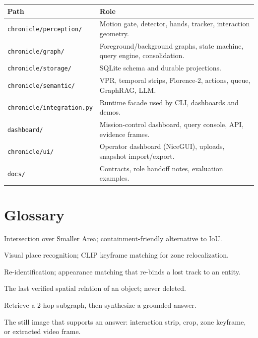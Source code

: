 \documentclass[10pt,a4paper]{article}
\newcommand{\code}[1]{\texttt{\small #1}}
\begin{document}
\begin{center}
\small
\begin{tabularx}{\linewidth}{@{}lX@{}}
\toprule
\textbf{Path} & \textbf{Role} \\
\midrule
\code{chronicle/perception/} & Motion gate, detector, hands, tracker, interaction geometry. \\
\code{chronicle/graph/} & Foreground/background graphs, state machine, query engine, consolidation. \\
\code{chronicle/storage/} & SQLite schema and durable projections. \\
\code{chronicle/semantic/} & VPR, temporal strips, Florence-2, actions, queue, GraphRAG, LLM. \\
\code{chronicle/integration.py} & Runtime facade used by CLI, dashboards and demos. \\
\code{dashboard/} & Mission-control dashboard, query console, API, evidence frames. \\
\code{chronicle/ui/} & Operator dashboard (NiceGUI), uploads, snapshot import/export. \\
\code{docs/} & Contracts, role handoff notes, evaluation examples. \\
\bottomrule
\end{tabularx}
\end{center}

\section{Glossary}

\begin{description}[leftmargin=1.6em,itemsep=1pt,topsep=1pt,style=nextline]
  \item[IoS] Intersection over Smaller Area; containment-friendly alternative to IoU.
  \item[VPR] Visual place recognition; CLIP keyframe matching for zone relocalization.
  \item[Re-ID] Re-identification; appearance matching that re-binds a lost track to an entity.
  \item[Terminal anchor] The last verified spatial relation of an object; never deleted.
  \item[GraphRAG] Retrieve a 2-hop subgraph, then synthesize a grounded answer.
  \item[Evidence frame] The still image that supports an answer: interaction strip, crop,
  zone keyframe, or extracted video frame.
\end{description}
\end{document}
